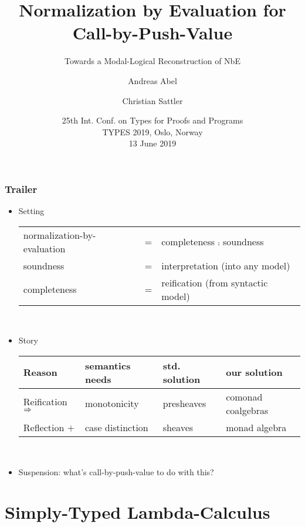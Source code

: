 \documentclass[t,fleqn,usenames,dvipsnames]{beamer}
\title[NbE for CBPV]{Normalization by Evaluation for Call-by-Push-Value}
\subtitle{Towards a Modal-Logical Reconstruction of NbE}
\author[Abel]{
  Andreas Abel\inst{1}
  \and Christian Sattler\inst{2}
}
\institute[] %
{
  \inst{1}%
  Department of Computer Science and Engineering\\
  Chalmers and Gothenburg University, Sweden \\[1ex]
  \and
  \inst{2}%
  School of Computer Science\\
  University of Nottingham, UK \\[1ex]
}
\date[TYPES 2019] %
{ 25th Int. Conf. on Types for Proofs and Programs \\
  TYPES 2019, Oslo, Norway \\
  13 June 2019
}
\begin{document}
\maketitle



\begin{frame}%
\frametitle{Trailer}
\begin{itemize}
\item Setting \\[2ex]
    \begin{tabular}{@{}lcl@{}}
normalization-by-evaluation & = & completeness $\comp$ soundness \\
soundness & = & interpretation (into any model) \\
completeness & = & reification (from syntactic model) \\
    \end{tabular}
\\[1ex]

\item Story \\[2ex]
  \begin{tabular}{@{}llll@{}}
Reason & semantics needs & std. solution & our solution \\
\hline
Reification $\Rightarrow$ & monotonicity & presheaves & comonad coalgebras \\
Reflection  $+$   & case distinction & sheaves & monad algebra \\
  \end{tabular}
\\[1ex]

\item Suspension: what's call-by-push-value to do with this?
\end{itemize}
\end{frame}


\section{Simply-Typed Lambda-Calculus}

\end{document}
